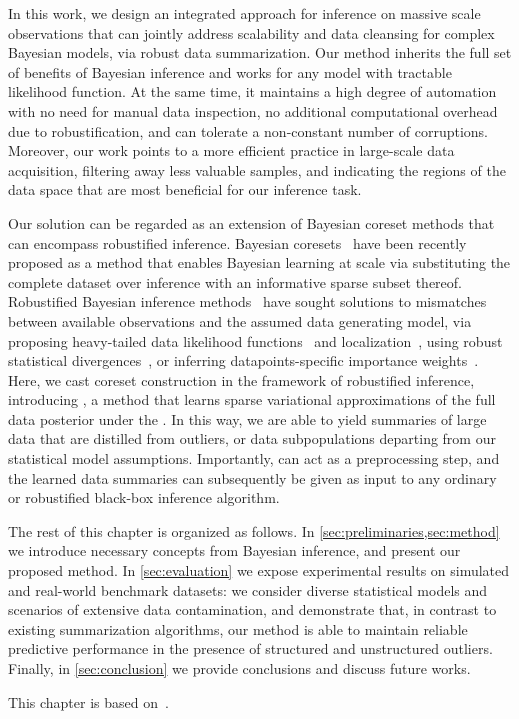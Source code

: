 In this work, we design an integrated approach for inference on massive scale observations that can jointly address scalability and data cleansing for complex Bayesian models, via robust data summarization. Our method inherits the full set of benefits of Bayesian inference and works for any model with tractable likelihood function. At the same time, it maintains a high degree of automation with no need for manual data inspection, no additional computational overhead due to robustification, and can tolerate a non-constant number of corruptions. Moreover, our work points to a more efficient practice in large-scale data acquisition, filtering away less valuable samples, and indicating the regions of the data space that are most beneficial for our inference task. 

Our solution can be regarded as an extension of Bayesian coreset methods that can encompass robustified inference. Bayesian coresets~\cite{huggins16, campbell19jmlr, campbell19neurips} have been recently proposed as a method that enables Bayesian learning at scale via substituting the complete dataset over inference with an informative sparse subset thereof. Robustified Bayesian inference methods~\cite{berger94} have sought solutions to mismatches between available observations and the assumed data generating model, %
via proposing heavy-tailed data likelihood functions~\cite{huber09, insua12} and localization~\cite{definetti61, wang18}, using robust statistical divergences~\cite{futami18, knoblauch18, miller19},  or inferring datapoints-specific importance weights~\cite{wang17}. Here, we cast coreset construction in the framework of robustified inference, introducing \emph{\bcores{}}, a method that learns sparse variational approximations of the full data posterior under the \bdiv{}. In this way, we are able to yield summaries of large data that are distilled from outliers, or data subpopulations departing from our statistical model assumptions. Importantly, \bcores{} can act as a preprocessing step, and the learned data summaries can subsequently be given as input to any ordinary or robustified black-box inference algorithm.

The rest of this chapter is organized as follows. In \cref{sec:preliminaries,sec:method} we introduce necessary concepts from Bayesian inference, and present our proposed method. In \cref{sec:evaluation} we expose experimental results on simulated and real-world benchmark datasets: we consider diverse statistical models and scenarios of extensive data contamination, and demonstrate that, in contrast to existing summarization algorithms, our method is able to maintain reliable predictive performance in the presence of structured and unstructured outliers. Finally, in \cref{sec:conclusion} we provide conclusions and discuss future works.

This chapter is based on~\citep{beta-cores}.




